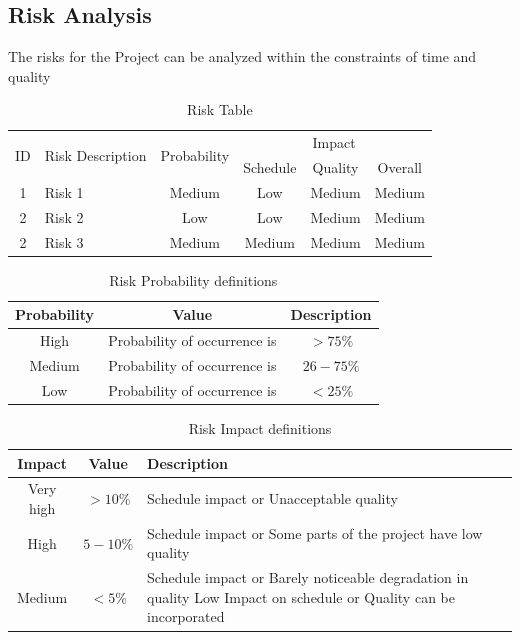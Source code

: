 \documentclass[oneside,a4paper,12pt]{book}
\begin{document}
\subsection{Risk Analysis}
The risks for the Project can be analyzed within the constraints of time and quality

\begin{table}[!htbp]
	\begin{center}
		\def\arraystretch{1.5}
		\begin{tabularx}{\textwidth}{| c | X | c | c | c | c |}
			\hline
			\multirow{2}{*}{ID} & \multirow{2}{*}{Risk Description}	& \multirow{2}{*}{Probability} & \multicolumn{3}{|c|}{Impact} \\ \cline{4-6}
			& & &	Schedule	& Quality	& Overall \\ \hline
			1	& Risk 1	& Medium	& Low	& Medium	& Medium \\ \hline
			2	& Risk 2	& Low	& Low	& Medium	& Medium \\
			\hline
			2	& Risk 3	& Medium	& Medium	& Medium	& Medium \\ \hline
		\end{tabularx}
	\end{center}
	\caption{Risk Table}
	\label{tab:risk}
\end{table}


\begin{table}[!htbp]
\begin{center}
\def\arraystretch{1.5}
\begin{tabular}{| c | c | c |}
\hline
Probability & Value &	Description \\ \hline
High &	Probability of occurrence is &  $ > 75 \% $ \\ \hline
Medium &	Probability of occurrence is  & $26-75 \% $ \\ \hline
Low	& Probability of occurrence is & $ < 25 \% $ \\ \hline
\end{tabular}
\end{center}
\caption{Risk Probability definitions }
\label{tab:riskdef}
\end{table}

\begin{table}[!htbp]
\begin{center}
\def\arraystretch{1.5}
\begin{tabularx}{\textwidth}{| c | c | X |}
\hline
Impact & Value	& Description \\ \hline
Very high &	$> 10 \%$ & Schedule impact or Unacceptable quality \\ \hline
High &	$5-10 \%$ & Schedule impact or Some parts of the project have low quality \\ \hline
Medium	& $ < 5 \% $ & Schedule impact or Barely noticeable degradation in quality Low	Impact on schedule or Quality can be incorporated \\ \hline
\end{tabularx}
\end{center}
\caption{Risk Impact definitions }
\label{tab:riskImpactDef}
\end{table}
\end{document}
